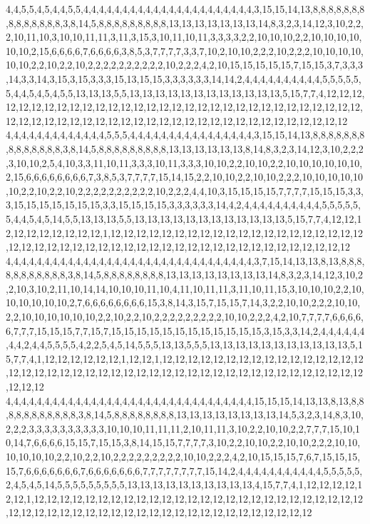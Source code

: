 4,4,5,5,4,5,4,4,5,5,4,4,4,4,4,4,4,4,4,4,4,4,4,4,4,4,4,4,4,4,4,4,3,15,15,14,13,8,8,8,8,8,8,8,8,8,8,8,8,8,8,3,8,14,5,8,8,8,8,8,8,8,8,8,13,13,13,13,13,13,13,14,8,3,2,3,14,12,3,10,2,2,2,10,11,10,3,10,10,11,11,3,11,3,15,3,10,11,10,11,3,3,3,3,2,2,10,10,10,2,2,10,10,10,10,10,10,2,15,6,6,6,6,7,6,6,6,6,3,8,5,3,7,7,7,7,3,3,7,10,2,10,10,2,2,2,10,2,2,2,10,10,10,10,10,10,2,2,10,2,2,10,2,2,2,2,2,2,2,2,2,2,10,2,2,2,4,2,10,15,15,15,15,15,7,15,15,3,7,3,3,3,14,3,3,14,3,15,3,15,3,3,3,15,13,15,15,3,3,3,3,3,3,14,14,2,4,4,4,4,4,4,4,4,4,4,5,5,5,5,5,5,4,4,5,4,5,4,5,5,13,13,13,5,5,13,13,13,13,13,13,13,13,13,13,13,13,5,15,7,7,4,12,12,12,12,12,12,12,12,12,12,12,12,12,12,12,12,12,12,12,12,12,12,12,12,12,12,12,12,12,12,12,12,12,12,12,12,12,12,12,12,12,12,12,12,12,12,12,12,12,12,12,12,12,12,12,12,12,12
4,4,4,4,4,4,4,4,4,4,4,4,4,5,5,5,4,4,4,4,4,4,4,4,4,4,4,4,4,4,4,4,3,15,15,14,13,8,8,8,8,8,8,8,8,8,8,8,8,8,8,3,8,14,5,8,8,8,8,8,8,8,8,8,13,13,13,13,13,13,8,14,8,3,2,3,14,12,3,10,2,2,2,3,10,10,2,5,4,10,3,3,11,10,11,3,3,3,10,11,3,3,3,10,10,2,2,10,10,2,2,10,10,10,10,10,10,2,15,6,6,6,6,6,6,6,6,7,3,8,5,3,7,7,7,7,15,14,15,2,2,10,10,2,2,10,10,2,2,2,10,10,10,10,10,10,2,2,10,2,2,10,2,2,2,2,2,2,2,2,2,2,10,2,2,2,4,4,10,3,15,15,15,15,7,7,7,7,15,15,15,3,3,3,15,15,15,15,15,15,15,3,3,15,15,15,15,3,3,3,3,3,3,14,4,2,4,4,4,4,4,4,4,4,4,4,5,5,5,5,5,5,4,4,5,4,5,14,5,5,13,13,13,5,5,13,13,13,13,13,13,13,13,13,13,13,13,5,15,7,7,4,12,12,12,12,12,12,12,12,12,12,1,12,12,12,12,12,12,12,12,12,12,12,12,12,12,12,12,12,12,12,12,12,12,12,12,12,12,12,12,12,12,12,12,12,12,12,12,12,12,12,12,12,12,12,12,12,12,12
4,4,4,4,4,4,4,4,4,4,4,4,4,4,4,4,4,4,4,4,4,4,4,4,4,4,4,4,4,4,4,4,3,7,15,14,13,13,8,13,8,8,8,8,8,8,8,8,8,8,8,3,8,14,5,8,8,8,8,8,8,8,8,13,13,13,13,13,13,13,13,14,8,3,2,3,14,12,3,10,2,2,10,3,10,2,11,10,14,14,10,10,10,11,10,4,11,10,11,11,3,11,10,11,15,3,10,10,10,2,2,10,10,10,10,10,10,2,7,6,6,6,6,6,6,6,6,15,3,8,14,3,15,7,15,15,7,14,3,2,2,10,10,2,2,2,10,10,2,2,10,10,10,10,10,10,2,2,10,2,2,10,2,2,2,2,2,2,2,2,2,10,10,2,2,2,4,2,10,7,7,7,7,6,6,6,6,6,7,7,7,15,15,15,7,7,15,7,15,15,15,15,15,15,15,15,15,15,15,15,3,15,3,3,14,2,4,4,4,4,4,4,4,4,2,4,4,5,5,5,5,4,2,2,5,4,5,14,5,5,5,13,13,5,5,5,13,13,13,13,13,13,13,13,13,13,13,5,15,7,7,4,1,12,12,12,12,12,12,1,12,12,1,12,12,12,12,12,12,12,12,12,12,12,12,12,12,12,12,12,12,12,12,12,12,12,12,12,12,12,12,12,12,12,12,12,12,12,12,12,12,12,12,12,12,12,12,12,12,12
4,4,4,4,4,4,4,4,4,4,4,4,4,4,4,4,4,4,4,4,4,4,4,4,4,4,4,4,4,4,4,4,15,15,15,14,13,13,8,13,8,8,8,8,8,8,8,8,8,8,8,3,8,14,5,8,8,8,8,8,8,8,8,13,13,13,13,13,13,13,13,14,5,3,2,3,14,8,3,10,2,2,2,3,3,3,3,3,3,3,3,3,3,10,10,10,11,11,11,2,10,11,11,3,10,2,2,10,10,2,2,7,7,7,15,10,10,14,7,6,6,6,6,15,15,7,15,15,3,8,14,15,15,7,7,7,7,3,10,2,2,10,10,2,2,10,10,2,2,2,10,10,10,10,10,10,2,2,10,2,2,10,2,2,2,2,2,2,2,2,2,10,10,2,2,2,4,2,10,15,15,15,7,6,7,15,15,15,15,7,6,6,6,6,6,6,6,7,6,6,6,6,6,6,6,7,7,7,7,7,7,7,7,15,14,2,4,4,4,4,4,4,4,4,4,4,4,5,5,5,5,5,2,4,5,4,5,14,5,5,5,5,5,5,5,5,5,13,13,13,13,13,13,13,13,13,13,4,15,7,7,4,1,12,12,12,12,12,12,1,12,12,12,12,12,12,12,12,12,12,12,12,12,12,12,12,12,12,12,12,12,12,12,12,12,12,12,12,12,12,12,12,12,12,12,12,12,12,12,12,12,12,12,12,12,12,12,12,12,12
